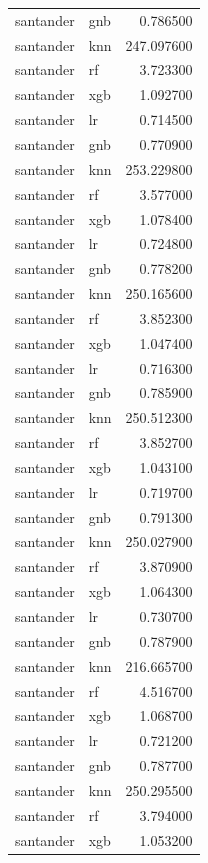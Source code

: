\begin{longtable}{llr}
santander & gnb & 0.786500 \\
santander & knn & 247.097600 \\
santander & rf & 3.723300 \\
santander & xgb & 1.092700 \\
santander & lr & 0.714500 \\
santander & gnb & 0.770900 \\
santander & knn & 253.229800 \\
santander & rf & 3.577000 \\
santander & xgb & 1.078400 \\
santander & lr & 0.724800 \\
santander & gnb & 0.778200 \\
santander & knn & 250.165600 \\
santander & rf & 3.852300 \\
santander & xgb & 1.047400 \\
santander & lr & 0.716300 \\
santander & gnb & 0.785900 \\
santander & knn & 250.512300 \\
santander & rf & 3.852700 \\
santander & xgb & 1.043100 \\
santander & lr & 0.719700 \\
santander & gnb & 0.791300 \\
santander & knn & 250.027900 \\
santander & rf & 3.870900 \\
santander & xgb & 1.064300 \\
santander & lr & 0.730700 \\
santander & gnb & 0.787900 \\
santander & knn & 216.665700 \\
santander & rf & 4.516700 \\
santander & xgb & 1.068700 \\
santander & lr & 0.721200 \\
santander & gnb & 0.787700 \\
santander & knn & 250.295500 \\
santander & rf & 3.794000 \\
santander & xgb & 1.053200 \\
\end{longtable}\endgroup\addtocounter{table}{-1}
